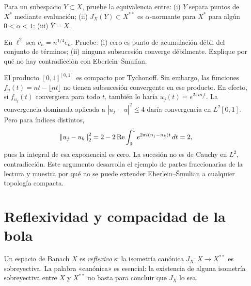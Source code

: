 \begin{ejercicio}\label{ej:v3-l17-4}
Para un subespacio $Y\subset X$, pruebe la equivalencia entre: (i) $Y$ separa puntos de $X^*$ mediante evaluación; (ii) $J_X(Y)\subset X^{**}$ es $\alpha$-normante para $X^*$ para algún $0<\alpha<1$; (iii) $\overline Y=X$.
\end{ejercicio}


\begin{ejercicio}\label{ej:v3-l17-5}
En $\ell^2$ sea $v_n=n^{1/4}e_n$. Pruebe: (i) cero es punto de acumulación débil del conjunto de términos; (ii) ninguna subsucesión converge débilmente. Explique por qué no hay contradicción con Eberlein--Šmulian.
\end{ejercicio}



\begin{ejemplo}
El producto $[0,1]^{[0,1]}$ es compacto por Tychonoff. Sin embargo, las funciones $f_n(t)=nt-\lfloor nt\rfloor$ no tienen subsucesión convergente en ese producto. En efecto, si $f_{n_j}(t)$ convergiera para todo $t$, también lo haría $u_j(t)=e^{2\pi i n_jt}$. La convergencia dominada aplicada a $|u_j-u|^2\leq4$ daría convergencia en $L^2[0,1]$. Pero para índices distintos,
\[
 \left\lVert u_j-u_k\right\rVert_2^2=2-2\operatorname{Re}\int_0^1e^{2\pi i(n_j-n_k)t}\,dt=2,
\]
pues la integral de esa exponencial es cero. La sucesión no es de Cauchy en $L^2$, contradicción. Este argumento desarrolla el ejemplo de partes fraccionarias de la lectura y muestra por qué no se puede extender Eberlein--Šmulian a cualquier topología compacta.
\end{ejemplo}

\section{Reflexividad y compacidad de la bola}\label{lec:v3-18}
\begin{definicion}
Un espacio de Banach $X$ es \emph{reflexivo} si la isometría canónica $J_X:X\to X^{**}$ es sobreyectiva. La palabra «canónica» es esencial: la existencia de alguna isometría sobreyectiva entre $X$ y $X^{**}$ no basta para concluir que $J_X$ lo sea.
\end{definicion}

